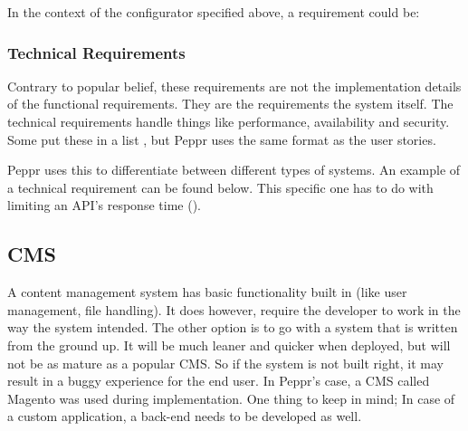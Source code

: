 \newline

In the context of the configurator specified above, a requirement could be: \newline

\newline

\subsubsection{Technical Requirements}
Contrary to popular belief, these requirements are not the implementation details of the functional requirements. They are the requirements the system itself. The technical requirements handle things like performance, availability and security. Some put these in a list \citet{Agile: Technical Requirements}, but Peppr uses the same format as the user stories. \newline

\newline

Peppr uses this to differentiate between different types of systems. An example of a technical requirement can be found below. This specific one has to do with limiting an API's response time (\citet{Response Times}).

\newline

\subsection{CMS}
A content management system has basic functionality built in (like user management, file handling). It does however, require  the developer to work in the way the system intended. The other option is to go with a system that is written from the ground up. It will be much leaner and quicker when deployed, but will not be as mature as a popular CMS. So if the system is not built right, it may result in a buggy experience for the end user. In Peppr's case, a CMS called Magento was used during implementation. One thing to keep in mind; In case of a custom application, a back-end needs to be developed as well.
